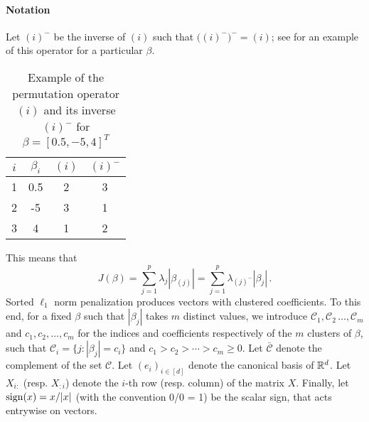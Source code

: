 \paragraph{Notation}\label{sec:notation}

Let \((i)^{-}\) be the inverse of \((i)\) such that
\(\big((i)^-\big)^- = (i)\); see  for an
example of this operator for a particular \(\beta\).
\begin{table}[hbt]
  \centering
  \caption{Example of the permutation operator \((i)\) and its inverse
    \((i)^-\) for $\beta = [0.5, -5, 4]^T$}
    \label{tab:permutation-example}
  \begin{tabular}{cS[table-format=-1.1,round-mode=off]cc}
    \toprule
    \(i\) & {\(\beta_i\)} & \((i)\) & \((i)^-\) \\
         & 0.5         & 2       & 3         \\
    2     & -5          & 3       & 1         \\
    3     & 4           & 1       & 2         \\
    \bottomrule
  \end{tabular}
\end{table}
This means that
\[
  J(\beta) = \sum_{j=1}^p \lambda_j |\beta_{(j)}|
  = \sum_{j=1}^p \lambda_{(j)^-}|\beta_j| \,.
\]
Sorted $\ell_1$ norm penalization produces vectors with clustered coefficients.
To this end, for a fixed $\beta$ such that $|\beta_j|$ takes $m$ distinct values, we introduce \(\mathcal{C}_1, \mathcal{C}_2\, \dots, \mathcal{C}_m\) and \(c_1,
c_2, \dots, c_m\) for the indices and coefficients respectively of the \(m\)
clusters of $\beta$, such that
$\mathcal{C}_i = \{j : |\beta_j| = c_i\}$ and $c_1 > c_2 > \cdots > c_m \geq 0.$
Let \(\bar{\mathcal{C}}\) denote the complement of the set \(\mathcal{C}\).
Let $(e_i)_{i \in [d]}$ denote the canonical basis of $\mathbb{R}^d$.
Let $X_{i:}$ (resp. $X_{:i}$) denote the $i$-th row (resp. column) of the matrix $X$.
Finally, let $\operatorname{sign}(x) = x / |x|$ (with the convention 0/0 = 1) be the scalar sign, that acts entrywise on vectors.


